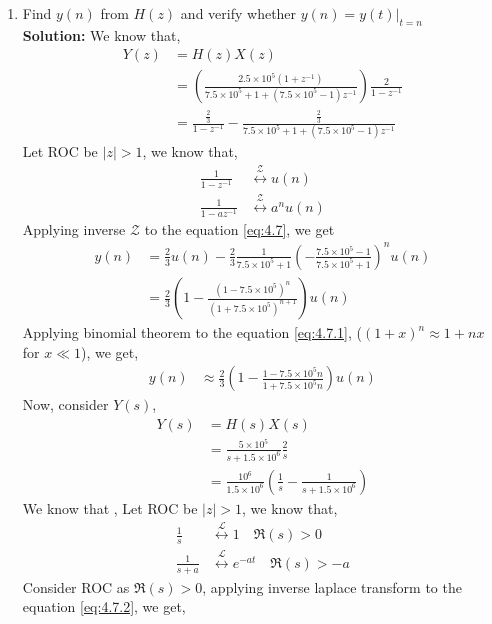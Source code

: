 \documentclass[journal,12pt,twocolumn]{IEEEtran}
\newcommand{\solution}{\noindent \textbf{Solution: }}
\providecommand{\brak}[1]{\ensuremath{\left(#1\right)}}
\providecommand{\abs}[1]{\left\vert#1\right\vert}
\providecommand{\system}[1]{\overset{\mathcal{#1}}{ \longleftrightarrow}}
\numberwithin{equation}{section}
\renewcommand\thesection{\arabic{section}}
\begin{document}
\begin{enumerate}[label=\thesection.\arabic*.,ref=\thesection.\theenumi]
		\item Find $y(n)$ from $H(z)$ and verify whether $y(n) = y(t)|_{t=n}$\\
		\solution 
		We know that, 
		\begin{align}
			Y(z) &= H(z)X(z) \\
			&= \brak{\frac{2.5\times10^5 (1+z^{-1})}{7.5\times10^5 + 1 + (7.5\times10^5 - 1)z^{-1}}} \frac{2}{1-z^{-1}} \\
			\label{eq:4.7}
			&= \frac{\frac{2}{3}}{1-z^{-1}} -\frac{\frac{2}{3}}{7.5\times10^5 + 1 + (7.5\times10^5 - 1)z^{-1}}
		\end{align}
		Let ROC be $\abs{z}>1$, we know that,
		\begin{align}
			\frac{1}{1-z^{-1}} &\system{Z} u(n)\\
			\frac{1}{1-a z^{-1}} &\system{Z} a^{n} u(n)
		\end{align}
		Applying inverse $\mathcal{Z}$ to the equation \eqref{eq:4.7}, we get 
		\begin{align}
			y(n) &= \frac{2}{3}u(n) - \frac{2}{3}\frac{1}{7.5\times10^5 + 1}\brak{-\frac{7.5\times10^5 - 1}{7.5\times10^5 + 1}}^nu(n) \\
			\label{eq:4.7.1}
			&= \frac{2}{3} \brak{1 - \frac{(1-7.5\times10^5)^n}{(1+7.5\times10^5)^{n+1}}}u(n)
		\end{align}
		Applying binomial theorem to the equation \eqref{eq:4.7.1}, ($(1+x)^{n} \approx 1+nx$ for $x \ll 1$), we get,
		\begin{align}
			\label{eq:4.7.3}
			y(n) &\approx \frac{2}{3} \brak{1 - \frac{1-7.5\times10^5n}{1+7.5\times10^5n}}u(n)
		\end{align}
		Now, consider $Y(s)$, 
		\begin{align}
			Y(s) &= H(s)X(s) \\
			&= \frac{5\times10^5}{s+1.5\times10^6} \frac{2}{s} \\
			\label{eq:4.7.2}
			&= \frac{10^6}{1.5\times10^6} \brak{\frac{1}{s} - \frac{1}{s+1.5\times10^6}}
		\end{align}
		We know that ,
		Let ROC be $\abs{z}>1$, we know that,
		\begin{align}
			\frac{1}{s} &\system{L} 1 \quad  \Re(s)>0\\
			\frac{1}{s+a} &\system{L} e^{-at} \quad \Re(s)>-a
		\end{align}
		Consider ROC as $\Re(s)>0$, applying inverse laplace transform to the equation \eqref{eq:4.7.2}, we get,  

\end{enumerate}
\end{document}

